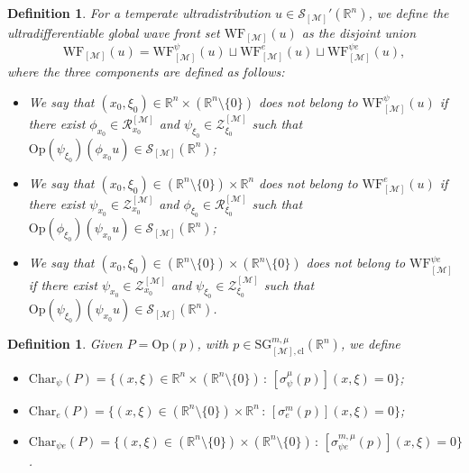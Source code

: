 \documentclass[11pt,reqno]{amsart}
\numberwithin{equation}{section}
\newtheorem{definition}[theorem]{Definition}
\newcommand{\R}{{\mathbb{R}}} %
\newcommand{\caS}{{\mathcal{S}}}
\newcommand{\RR}{{\mathcal{R}}}
\newcommand{\ZZ}{{\mathcal{Z}}}
\newcommand{\Op}{{\mathrm{Op}}}
\newcommand{\SG}{{\mathrm{SG}}}
\newcommand{\M}{{\mathcal{M}}} %
\begin{document}
\begin{definition}
	For a temperate ultradistribution $u\in\caS_{[\M]}'(\R^n)$, we define the ultradifferentiable global wave front set $\mathrm{WF}_{[\M]}(u)$ as the disjoint union
	\begin{equation*}
		\mathrm{WF}_{[\M]}(u) = \mathrm{WF}_{[\M]}^{\psi}(u) \sqcup \mathrm{WF}_{[\M]}^e(u) \sqcup \mathrm{WF}_{[\M]}^{\psi e}(u),
	\end{equation*}
	where the three components are defined as follows:
	\begin{itemize}
		\item We say that $(x_0,\xi_0)\in\R^{n}\times(\R^n\setminus\{0\})$ does not belong to $\mathrm{WF}_{[\M]}^{\psi}(u)$ if there exist $\phi_{x_0}\in\RR_{x_0}^{[\M]}$ and $\psi_{\xi_0}\in \ZZ_{\xi_0}^{[\M]}$ such that $\Op(\psi_{\xi_0})(\phi_{x_0}u)\in\caS_{[\M]}(\R^n)$;
		
		\item We say that $(x_0,\xi_0)\in(\R^n\setminus\{0\})\times \R^{n}$ does not belong to $\mathrm{WF}_{[\M]}^{e}(u)$ if there exist $\psi_{x_0}\in\ZZ_{x_0}^{[\M]}$ and $\phi_{\xi_0}\in \RR_{\xi_0}^{[\M]}$ such that $\Op(\phi_{\xi_0})(\psi_{x_0}u)\in\caS_{[\M]}(\R^n)$;
		
		\item We say that $(x_0,\xi_0)\in(\R^n\setminus\{0\})\times(\R^n\setminus\{0\})$ does not belong to $\mathrm{WF}_{[\M]}^{\psi e}$ if there exist $\psi_{x_0}\in\ZZ_{x_0}^{[\M]}$ and $\psi_{\xi_0}\in\ZZ_{\xi_0}^{[\M]}$ such that $\Op(\psi_{\xi_0})(\psi_{x_0}u)\in\caS_{[\M]}(\R^n)$.
	\end{itemize}
\end{definition}


\begin{definition}
	Given $P= \Op(p)$, with $p\in\SG_{[\M],\mathrm{cl}}^{m,\mu}(\R^n)$, we define
	\begin{itemize}
		\item $\mathrm{Char}_\psi(P) = \{(x,\xi)\in \R^n\times (\R^n\setminus\{0\}) \,:\, [\sigma_\psi^{\mu}(p)](x,\xi)=0\}$;
		
		\item $\mathrm{Char}_e(P) = \{ (x,\xi)\in (\R^n\setminus\{0\})\times\R^n \,:\, [\sigma_e^{m}(p)](x,\xi)=0 \}$;
		
		\item $\mathrm{Char}_{\psi e}(P) = \{(x,\xi)\in (\R^n\setminus\{0\})\times (\R^n\setminus\{0\}) \,:\, [\sigma_{\psi e}^{m,\mu}(p)](x,\xi)=0\}$.
	\end{itemize}
\end{definition}
\end{document}
